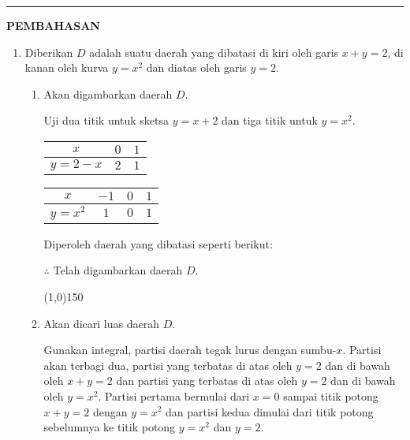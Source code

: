 \vspace{0.2cm}\hrule height 1pt\vspace{0.5cm}


\begin{center}
\textbf{\large{PEMBAHASAN}}
\end{center}
\begin{enumerate}[leftmargin=*, label={\arabic*}.]
\item Diberikan $D$ adalah suatu daerah yang dibatasi di kiri oleh garis $x+y=2$, 
di kanan oleh kurva $y=x^{2}$ dan diatas oleh garis $y=2$.
    \begin{enumerate}[label={\alph*}.]
    \item Akan digambarkan daerah $D$.
    
    Uji dua titik untuk sketsa $y=x+2$ dan tiga titik untuk $y=x^2$.
    \begin{center}
        \begin{tabular}{|c|c|c|}\hline
            $x$  & $0$ & $1$ \\ \hline
            $y=2-x$ & $2$ & $1$ \\ \hline
        \end{tabular}\quad
        \begin{tabular}{|c|c|c|c|}\hline
            $x$ & $-1$ & $0$ & $1$ \\ \hline
            $y=x^{2}$ & $1$ & $0$ & $1$ \\ \hline
        \end{tabular}
    \end{center}
    Diperoleh daerah yang dibatasi seperti berikut:

    

    $\therefore$ Telah digambarkan daerah $D$.


\begin{center}\line(1,0){150}\end{center}


    \item Akan dicari luas daerah $D$.
    
    Gunakan integral, partisi daerah tegak lurus dengan sumbu-$x$. Partisi akan terbagi dua, partisi 
    yang terbatas di atas oleh $y=2$ dan di bawah oleh $x+y=2$ dan partisi yang terbatas di atas oleh 
    $y=2$ dan di bawah oleh $y=x^2$. Partisi pertama bermulai dari $x=0$ sampai titik potong $x+y=2$ 
    dengan $y=x^{2}$ dan partisi kedua dimulai dari titik potong sebelumnya ke titik potong $y=x^{2}$ 
    dan $y=2$.


\end{enumerate}
\end{enumerate}
